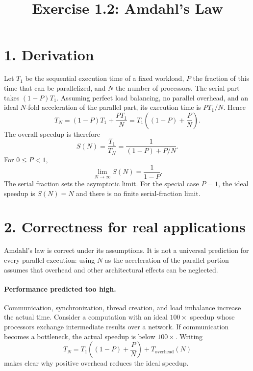 \documentclass[11pt,a4paper]{article}
\title{Exercise 1.2: Amdahl's Law}
\author{}
\date{}
\begin{document}
\maketitle
\vspace{-2em}
\section*{1. Derivation}
Let $T_1$ be the sequential execution time of a fixed workload, $P$ the fraction
of this time that can be parallelized, and $N$ the number of processors.
The serial part takes $(1-P)T_1$. Assuming perfect load balancing, no parallel
overhead, and an ideal $N$-fold acceleration of the parallel part, its execution
time is $PT_1/N$. Hence
\begin{equation}
  T_N=(1-P)T_1+\frac{PT_1}{N}
     =T_1\left((1-P)+\frac{P}{N}\right).
\end{equation}
The overall speedup is therefore
\begin{equation}
  \boxed{S(N)=\frac{T_1}{T_N}=\frac{1}{(1-P)+P/N}}.
  \label{eq:law}
\end{equation}
For $0\leq P<1$,
\begin{equation}
  \lim_{N\to\infty}S(N)=\frac{1}{1-P}.
\end{equation}
The serial fraction sets the asymptotic limit. For the special case $P=1$,
the ideal speedup is $S(N)=N$ and there is no finite serial-fraction limit.

\section*{2. Correctness for real applications}
Amdahl's law is correct under its assumptions. It is not a universal prediction
for every parallel execution: using $N$ as the acceleration of the parallel
portion assumes that overhead and other architectural effects can be neglected.

\paragraph{Performance predicted too high.}
Communication, synchronization, thread creation, and load imbalance increase
the actual time. Consider a computation with an ideal $100\times$ speedup
whose processors exchange intermediate results
over a network. If communication becomes a bottleneck, the actual speedup
is below $100\times$. Writing
\[
  T_N=T_1\left((1-P)+\frac{P}{N}\right)+T_{\mathrm{overhead}}(N)
\]
makes clear why positive overhead reduces the ideal speedup.
\end{document}
